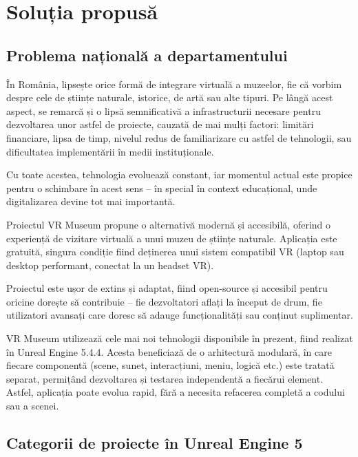 \chapter{Soluția propusă}
\label{cap:cap3}

\section{Problema națională a departamentului}

În România, lipsește orice formă de integrare virtuală a muzeelor, fie că vorbim despre cele de științe naturale, istorice, de artă sau alte tipuri. Pe lângă acest aspect, se remarcă și o lipsă semnificativă a infrastructurii necesare pentru dezvoltarea unor astfel de proiecte, cauzată de mai mulți factori: limitări financiare, lipsa de timp, nivelul redus de familiarizare cu astfel de tehnologii, sau dificultatea implementării în medii instituționale.

Cu toate acestea, tehnologia evoluează constant, iar momentul actual este propice pentru o schimbare în acest sens – în special în context educațional, unde digitalizarea devine tot mai importantă.

Proiectul VR Museum propune o alternativă modernă și accesibilă, oferind o experiență de vizitare virtuală a unui muzeu de științe naturale. Aplicația este gratuită, singura condiție fiind deținerea unui sistem compatibil VR (laptop sau desktop performant, conectat la un headset VR).

Proiectul este ușor de extins și adaptat, fiind open-source și accesibil pentru oricine dorește să contribuie – fie dezvoltatori aflați la început de drum, fie utilizatori avansați care doresc să adauge funcționalități sau conținut suplimentar.

VR Museum utilizează cele mai noi tehnologii disponibile în prezent, fiind realizat în Unreal Engine 5.4.4. Acesta beneficiază de o arhitectură modulară, în care fiecare componentă (scene, sunet, interacțiuni, meniu, logică etc.) este tratată separat, permițând dezvoltarea și testarea independentă a fiecărui element. Astfel, aplicația poate evolua rapid, fără a necesita refacerea completă a codului sau a scenei.

\section{Categorii de proiecte în Unreal Engine 5}

